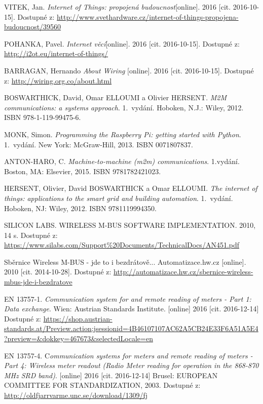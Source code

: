 \begin{literatura}{99}

 VITEK, Jan. \textit{Internet of Things: propojená budoucnost}[online]. 2016 [cit. 2016-10-15]. Dostupné z: \url{http://www.svethardware.cz/internet-of-things-propojena-budoucnost/39560}

 POHANKA, Pavel. \textit{Internet věcí}[online]. 2016 [cit. 2016-10-15]. Dostupné z: \url{http://i2ot.eu/internet-of-things/}

 BARRAGAN, Hernando \textit{About Wiring} [online]. 2016 [cit. 2016-10-15]. Dostupné z: \url{http://wiring.org.co/about.html}

 BOSWARTHICK, David, Omar ELLOUMI a Olivier HERSENT. \textit{M2M communications: a systems approach}. 1.~vydání. Hoboken, N.J.: Wiley, 2012. ISBN 978-1-119-99475-6.

 MONK, Simon. \textit{Programming the Raspberry Pi: getting started with Python}. 1.~vydání. New York: McGraw-Hill, 2013. ISBN 0071807837.
	
 ANTON-HARO, C. \textit{Machine-to-machine (m2m) communications}. 1.vydání. Boston, MA: Elsevier, 2015. ISBN 9781782421023.	

 HERSENT, Olivier, David BOSWARTHICK a Omar ELLOUMI. \textit{The internet of things: applications to the smart grid and building automation}. 1.~vydání. Hoboken, NJ: Wiley, 2012. ISBN 9781119994350.

 SILICON LABS. WIRELESS M-BUS SOFTWARE IMPLEMENTATION. 2010, 14 s. Dostupné z: \url{https://www.silabs.com/Support\%20Documents/TechnicalDocs/AN451.pdf}

 Sběrnice Wireless M-BUS - jde to i bezdrátově... Automatizace.hw.cz [online]. 2010 [cit. 2014-10-28]. Dostupné z: \url{http://automatizace.hw.cz/sbernice-wireless-mbus-jde-i-bezdratove}

 EN 13757-1. \textit{Communication system for and remote reading of meters - Part 1: Data exchange}. Wien: Austrian Standards Institute. [online] 2016 [cit. 2016-12-14]  Dostupné z: \url{https://shop.austrian-standards.at/Preview.action;jsessionid=4B46107107AC62A5CB24E33F6A51A5E4?preview=\&dokkey=467673\&selectedLocale=en}
				
 EN 13757-4. C\textit{ommunication systems for meters and remote reading of meters - Part 4: Wireless meter readout (Radio Meter reading for operation in the 868-870 MHz SRD band)}. [online] 2016 [cit. 2016-12-14] Brusel: EUROPEAN COMMITTEE FOR STANDARDIZATION, 2003. Dostupné z: \url{http://oldfjarrvarme.unc.se/download/1309/fj}


\end{literatura}

